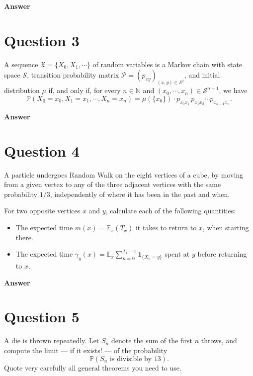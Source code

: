 \documentclass[letterpaper]{article}
\begin{document}
		\textbf{Answer}
		
		\clearpage
		
		\section{Question 3}
		
		A sequence $\mathfrak{X} = \{X_0, X_1, \cdots\}$ of random variables is a Markov chain with state space $\mathcal{S}$, transition probability matrix $\mathcal{P} = (p_{xy})_{(x,y) \in \mathcal{S}^2}$, and initial distribution $\mu$ if, and only if, for every $n \in \mathbb{N}$ and $(x_0, \cdots, x_n) \in \mathcal{S}^{n+1}$, we have
		\[
		\mathbb{P}(X_0 = x_0, X_1 = x_1, \cdots, X_n = x_n) = \mu(\{x_0\}) \cdot p_{x_0 x_1}\, p_{x_1 x_2} \cdots p_{x_{n-1} x_n}.
		\]
		
		\textbf{Answer}
		
		\clearpage
		
		\section{Question 4}
		
		
		A particle undergoes Random Walk on the eight vertices of a cube, by moving from a given vertex to any of the three adjacent vertices with the same probability $1/3$, independently of where it has been in the past and when.
		
		\indent For two opposite vertices $x$ and $y$, calculate each of the following quantities:
		\begin{itemize}
			\item[(i)] The expected time $m(x) = \mathbb{E}_x(T_x)$ it takes to return to $x$, when starting there.
			\item[(ii)] The expected time $\gamma_y(x) = \mathbb{E}_x \sum_{n=0}^{T_x - 1} \mathbf{1}_{\{X_n = y\}}$ spent at $y$ before returning to $x$.
		\end{itemize}
		
		
		\textbf{Answer}
		
		\clearpage
		
		\section{Question 5}
		
		A die is thrown repeatedly. Let $S_n$ denote the sum of the first $n$ throws, and compute the limit --- if it exists! --- of the probability
		\[
		\mathbb{P}\left(S_n \text{ is divisible by } 13\right).
		\]
		Quote very carefully all general theorems you need to use.
		
\end{document}
